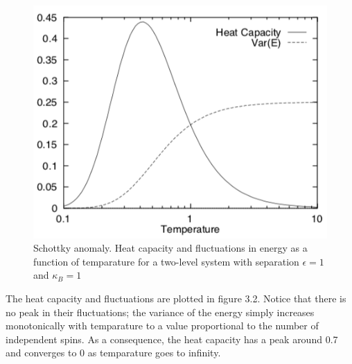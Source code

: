 \documentclass[openany]{memoir}
\begin{document}
\begin{figure}
\center
\includegraphics[scale=1]{./Fluc.png}
\caption{Schottky anomaly. Heat capacity and fluctuations in energy as a function of temparature for a two-level system with separation $\epsilon = 1$ and $\kappa_{B} = 1$}
\end{figure}

The heat capacity and fluctuations are plotted in figure 3.2. Notice that there is no peak in their fluctuations; the variance of the energy simply increases monotonically with temparature to a value proportional to the number of independent spins. As a consequence, the heat capacity has a peak around 0.7 and converges to 0 as temparature goes to infinity. 
\end{document}
